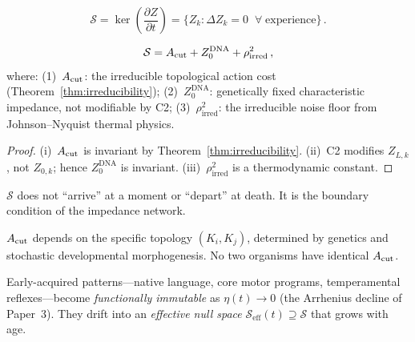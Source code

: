 \documentclass[aps,pre,twocolumn,superscriptaddress,floatfix]{revtex4-2}
\begin{document}
\begin{definition}
\begin{equation}
  \mathcal{S} = \ker\!\left(\frac{\partial Z}{\partial t}\right)
  = \{Z_k : \Delta Z_k = 0\;\;\forall\;\text{experience}\}\,.
  \label{eq:soul}
\end{equation}
\end{definition}

\begin{theorem}
\label{thm:soul-decomp}
\begin{equation}
  \mathcal{S} = A_{\text{cut}} + Z_0^{\text{DNA}} + \rho_{\text{irred}}^2\,,
  \label{eq:soul-decomposition}
\end{equation}
where:
(1)~$A_{\text{cut}}$: the irreducible topological action cost
   (Theorem~\ref{thm:irreducibility});
(2)~$Z_0^{\text{DNA}}$: genetically fixed characteristic
   impedance, not modifiable by C2;
(3)~$\rho_{\text{irred}}^2$: the irreducible noise floor
   from Johnson--Nyquist thermal physics.
\end{theorem}

\begin{proof}
(i)~$A_{\text{cut}}$ is invariant by Theorem~\ref{thm:irreducibility}.
(ii)~C2 modifies $Z_{L,k}$, not $Z_{0,k}$; hence
$Z_0^{\text{DNA}}$ is invariant.
(iii)~$\rho_{\text{irred}}^2$ is a thermodynamic constant.
\end{proof}

\begin{corollary}
$\mathcal{S}$ does not ``arrive'' at a moment or ``depart''
at death.
It is the boundary condition of the impedance network.
\end{corollary}

\begin{corollary}[Uniqueness]
$A_{\text{cut}}$ depends on the specific topology $(K_i,K_j)$,
determined by genetics and stochastic developmental
morphogenesis.
No two organisms have identical $A_{\text{cut}}$.
\end{corollary}

\begin{remark}
\label{rem:null-developmental}
Early-acquired patterns---native language, core motor
programs, temperamental reflexes---become
\emph{functionally immutable} as $\eta(t) \to 0$
(the Arrhenius decline of Paper~3).
They drift into an \emph{effective null space}
$\mathcal{S}_{\text{eff}}(t) \supseteq \mathcal{S}$
that grows with age.
\end{remark}
\end{document}
